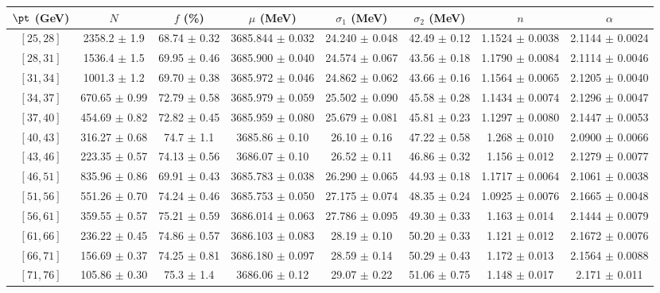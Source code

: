 \begin{tabular}{c||c|c|c|c|c|c|c}
$\pt$ (GeV) & $N$ & $f$ (\%) & $\mu$ (MeV) & $\sigma_1$ (MeV) & $\sigma_2$ (MeV) & $n$ & $\alpha$ \\
\hline
$[25, 28]$ & 2358.2 $\pm$ 1.9 & 68.74 $\pm$ 0.32 & 3685.844 $\pm$ 0.032 & 24.240 $\pm$ 0.048 & 42.49 $\pm$ 0.12 & 1.1524 $\pm$ 0.0038 & 2.1144 $\pm$ 0.0024\\
$[28, 31]$ & 1536.4 $\pm$ 1.5 & 69.95 $\pm$ 0.46 & 3685.900 $\pm$ 0.040 & 24.574 $\pm$ 0.067 & 43.56 $\pm$ 0.18 & 1.1790 $\pm$ 0.0084 & 2.1114 $\pm$ 0.0046\\
$[31, 34]$ & 1001.3 $\pm$ 1.2 & 69.70 $\pm$ 0.38 & 3685.972 $\pm$ 0.046 & 24.862 $\pm$ 0.062 & 43.66 $\pm$ 0.16 & 1.1564 $\pm$ 0.0065 & 2.1205 $\pm$ 0.0040\\
$[34, 37]$ & 670.65 $\pm$ 0.99 & 72.79 $\pm$ 0.58 & 3685.979 $\pm$ 0.059 & 25.502 $\pm$ 0.090 & 45.58 $\pm$ 0.28 & 1.1434 $\pm$ 0.0074 & 2.1296 $\pm$ 0.0047\\
$[37, 40]$ & 454.69 $\pm$ 0.82 & 72.82 $\pm$ 0.45 & 3685.959 $\pm$ 0.080 & 25.679 $\pm$ 0.081 & 45.81 $\pm$ 0.23 & 1.1297 $\pm$ 0.0080 & 2.1447 $\pm$ 0.0053\\
$[40, 43]$ & 316.27 $\pm$ 0.68 & 74.7 $\pm$ 1.1 & 3685.86 $\pm$ 0.10 & 26.10 $\pm$ 0.16 & 47.22 $\pm$ 0.58 & 1.268 $\pm$ 0.010 & 2.0900 $\pm$ 0.0066\\
$[43, 46]$ & 223.35 $\pm$ 0.57 & 74.13 $\pm$ 0.56 & 3686.07 $\pm$ 0.10 & 26.52 $\pm$ 0.11 & 46.86 $\pm$ 0.32 & 1.156 $\pm$ 0.012 & 2.1279 $\pm$ 0.0077\\
$[46, 51]$ & 835.96 $\pm$ 0.86 & 69.91 $\pm$ 0.43 & 3685.783 $\pm$ 0.038 & 26.290 $\pm$ 0.065 & 44.93 $\pm$ 0.18 & 1.1717 $\pm$ 0.0064 & 2.1061 $\pm$ 0.0038\\
$[51, 56]$ & 551.26 $\pm$ 0.70 & 74.24 $\pm$ 0.46 & 3685.753 $\pm$ 0.050 & 27.175 $\pm$ 0.074 & 48.35 $\pm$ 0.24 & 1.0925 $\pm$ 0.0076 & 2.1665 $\pm$ 0.0048\\
$[56, 61]$ & 359.55 $\pm$ 0.57 & 75.21 $\pm$ 0.59 & 3686.014 $\pm$ 0.063 & 27.786 $\pm$ 0.095 & 49.30 $\pm$ 0.33 & 1.163 $\pm$ 0.014 & 2.1444 $\pm$ 0.0079\\
$[61, 66]$ & 236.22 $\pm$ 0.45 & 74.86 $\pm$ 0.57 & 3686.103 $\pm$ 0.083 & 28.19 $\pm$ 0.10 & 50.20 $\pm$ 0.33 & 1.121 $\pm$ 0.012 & 2.1672 $\pm$ 0.0076\\
$[66, 71]$ & 156.69 $\pm$ 0.37 & 74.25 $\pm$ 0.81 & 3686.180 $\pm$ 0.097 & 28.59 $\pm$ 0.14 & 50.29 $\pm$ 0.43 & 1.172 $\pm$ 0.013 & 2.1564 $\pm$ 0.0088\\
$[71, 76]$ & 105.86 $\pm$ 0.30 & 75.3 $\pm$ 1.4 & 3686.06 $\pm$ 0.12 & 29.07 $\pm$ 0.22 & 51.06 $\pm$ 0.75 & 1.148 $\pm$ 0.017 & 2.171 $\pm$ 0.011\\

\end{tabular}
